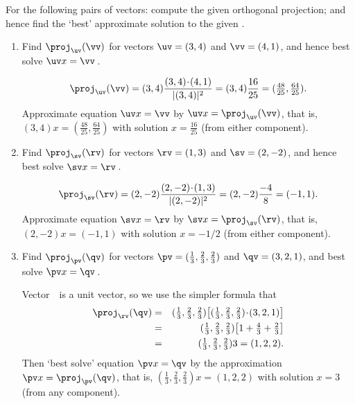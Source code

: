 \begin{example} \label{eg:projline}
For the following pairs of vectors: 
compute the given orthogonal projection; 
and hence find the `best' approximate solution to the given .
\begin{enumerate}
\item Find \(\proj_\uv(\vv)\) for vectors \(\uv=(3,4)\) and \(\vv=(4,1)\), and hence best solve \(\uv x=\vv\)\,.
\begin{solution} 
\begin{equation*}
\proj_\uv(\vv)=(3,4)\frac{(3,4)\cdot(4,1)}{|(3,4)|^2}
=(3,4)\frac{16}{25}
=(\tfrac{48}{25},\tfrac{64}{25}).
\end{equation*}
Approximate equation \(\uv x=\vv\) by \(\uv x=\proj_\uv(\vv)\), that is, \((3,4)x=(\tfrac{48}{25},\tfrac{64}{25})\) with solution \(x=\tfrac{16}{25}\) (from either component).
\end{solution}

\item Find \(\proj_\sv(\rv)\) for vectors \(\rv=(1,3)\) and \(\sv=(2,-2)\), and hence best solve \(\sv x=\rv\)\,.
\begin{solution} 
\begin{equation*}
\proj_\sv(\rv)=(2,-2)\frac{(2,-2)\cdot(1,3)}{|(2,-2)|^2}
=(2,-2)\frac{-4}{8}
=(-1,1).
\end{equation*}
Approximate equation \(\sv x=\rv\) by \(\sv x=\proj_\sv(\rv)\), that is, \((2,-2)x=(-1,1)\) with solution \(x=-1/2\)  (from either component).
\end{solution}

\item Find \(\proj_\pv(\qv)\) for vectors \(\pv=(\tfrac13,\tfrac23,\tfrac23)\) and \(\qv=(3,2,1)\), and best solve \(\pv x=\qv\)\,.
\begin{solution} 
Vector~\rv\ is a unit vector, so we use the simpler formula that
\begin{eqnarray*}
\proj_\rv(\qv)&=& (\tfrac13,\tfrac23,\tfrac23)\big[(\tfrac13,\tfrac23,\tfrac23)\cdot(3,2,1)\big]
\\&=&(\tfrac13,\tfrac23,\tfrac23)\big[1+\tfrac43+\tfrac23\big] 
\\&=&(\tfrac13,\tfrac23,\tfrac23)3
=(1,2,2).
\end{eqnarray*}
Then `best solve' equation \(\pv x=\qv\) by the approximation \(\pv x=\proj_\pv(\qv)\), that is, \((\tfrac13,\tfrac23,\tfrac23)x=(1,2,2)\) with solution \(x=3\) (from any component).
\end{solution}
\end{enumerate}
\end{example}







